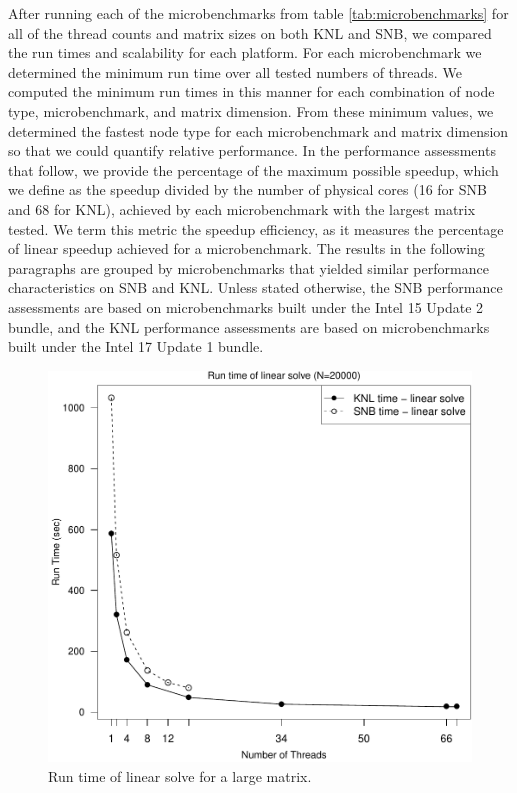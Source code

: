 After running each of the microbenchmarks from table \ref{tab:microbenchmarks} for all of
the thread counts and matrix sizes on both KNL and SNB, we compared the run times and
scalability for each platform. For each microbenchmark we determined the minimum run time
over all tested numbers of threads. We computed the minimum run times in this manner for
each combination of node type, microbenchmark, and matrix dimension. From these minimum
values, we determined the fastest node type for each microbenchmark and matrix dimension
so that we could quantify relative performance. In the performance assessments that
follow, we provide the percentage of the maximum possible speedup, which we define as the
speedup divided by the number of physical cores (16 for SNB and 68 for KNL), achieved by
each microbenchmark with the largest matrix tested. We term this metric the speedup efficiency,
as it measures the percentage of linear speedup achieved for a microbenchmark. The results in
the following paragraphs are grouped by microbenchmarks that yielded similar performance
characteristics on SNB and KNL. Unless stated otherwise, the SNB performance assessments
are based on microbenchmarks built under the Intel 15 Update 2 bundle, and the KNL
performance assessments are based on microbenchmarks built under the Intel 17 Update 1
bundle.

\begin{figure}
\includegraphics[height=\columnwidth, width=\columnwidth]{linsolve_20000_68-rt.pdf}
\caption{Run time of linear solve for a large matrix.}
\label{fig:largeLinsolveTime}
\end{figure}

